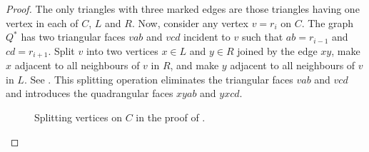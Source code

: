 \documentclass{patmorin}
\begin{document}
\begin{proof}
   The only triangles with three marked edges are those triangles
   having one vertex in each of $C$, $L$ and $R$.  Now, consider any
   vertex $v=r_i$ on $C$.  The graph $Q^*$ has two triangular faces $vab$
   and $vcd$ incident to $v$ such that $ab=r_{i-1}$ and $cd=r_{i+1}$.
   Split $v$ into two vertices $x\in L$ and $y\in R$ joined by the edge
   $xy$, make $x$ adjacent to all neighbours of $v$ in $R$, and make
   $y$ adjacent to all neighbours of $v$ in $L$. See .
   This splitting operation eliminates the triangular faces $vab$ and
   $vcd$ and introduces the quadrangular faces $xyab$ and $yxcd$.

   \begin{figure}
      \caption{Splitting vertices on $C$ in the proof of
      .}
   \end{figure}


\end{proof}
\end{document}
